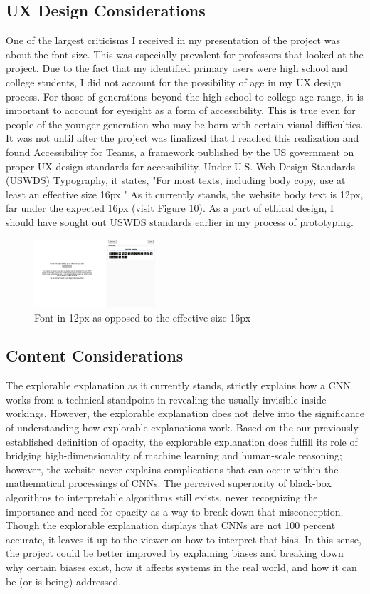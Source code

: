 \documentclass[10pt,twocolumn]{article}
\begin{document}
\subsection{UX Design Considerations}
One of the largest criticisms I received in my presentation of the project was about the font size. This was especially prevalent for professors that looked at the project. Due to the fact that my identified primary users were high school and college students, I did not account for the possibility of age in my UX design process. For those of generations beyond the high school to college age range, it is important to account for eyesight as a form of accessibility. This is true even for people of the younger generation who may be born with certain visual difficulties. It was not until after the project was finalized that I reached this realization and found Accessibility for Teams, a framework published by the US government on proper UX design standards for accessibility. Under U.S. Web Design Standards (USWDS) Typography, it states, "For most texts, including body copy, use at least an effective size 16px." \cite{typography} As it currently stands, the website body text is 12px, far under the expected 16px (visit Figure 10). As a part of ethical design, I should have sought out USWDS standards earlier in my process of prototyping. 
\begin{figure}[h]
\caption{Font in 12px as opposed to the effective size 16px}
\centering
\includegraphics[width=0.4\textwidth]{./Images/FontSizeScreenShot.png}
\end{figure}

\subsection{Content Considerations}
The explorable explanation as it currently stands, strictly explains how a CNN works from a technical standpoint in revealing the usually invisible inside workings. However, the explorable explanation does not delve into the significance of understanding how explorable explanations work. Based on the our previously established definition of opacity, the explorable explanation does fulfill its role of bridging high-dimensionality of machine learning and human-scale reasoning; however, the website never explains complications that can occur within the mathematical processings of CNNs. The perceived superiority of black-box algorithms to interpretable algorithms still exists, never recognizing the importance and need for opacity as a way to break down that misconception. Though the explorable explanation displays that CNNs are not 100 percent accurate, it leaves it up to the viewer on how to interpret that bias. In this sense, the project could be better improved by explaining biases and breaking down why certain biases exist, how it affects systems in the real world, and how it can be (or is being) addressed. 
\end{document}
